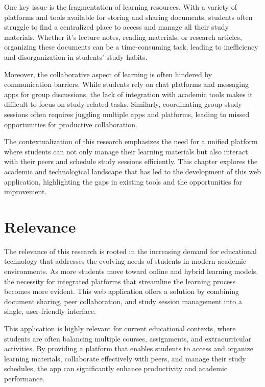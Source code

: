 One key issue is the fragmentation of learning resources. With a variety of platforms and tools available for storing and sharing documents, students often struggle to find a centralized place to access and manage all their study materials. Whether it's lecture notes, reading materials, or research articles, organizing these documents can be a time-consuming task, leading to inefficiency and disorganization in students' study habits.

Moreover, the collaborative aspect of learning is often hindered by communication barriers. While students rely on chat platforms and messaging apps for group discussions, the lack of integration with academic tools makes it difficult to focus on study-related tasks. Similarly, coordinating group study sessions often requires juggling multiple apps and platforms, leading to missed opportunities for productive collaboration.

The contextualization of this research emphasizes the need for a unified platform where students can not only manage their learning materials but also interact with their peers and schedule study sessions efficiently. This chapter explores the academic and technological landscape that has led to the development of this web application, highlighting the gaps in existing tools and the opportunities for improvement.

\section{Relevance}

The relevance of this research is rooted in the increasing demand for educational technology that addresses the evolving needs of students in modern academic environments. As more students move toward online and hybrid learning models, the necessity for integrated platforms that streamline the learning process becomes more evident. This web application offers a solution by combining document sharing, peer collaboration, and study session management into a single, user-friendly interface.

This application is highly relevant for current educational contexts, where students are often balancing multiple courses, assignments, and extracurricular activities. By providing a platform that enables students to access and organize learning materials, collaborate effectively with peers, and manage their study schedules, the app can significantly enhance productivity and academic performance.

